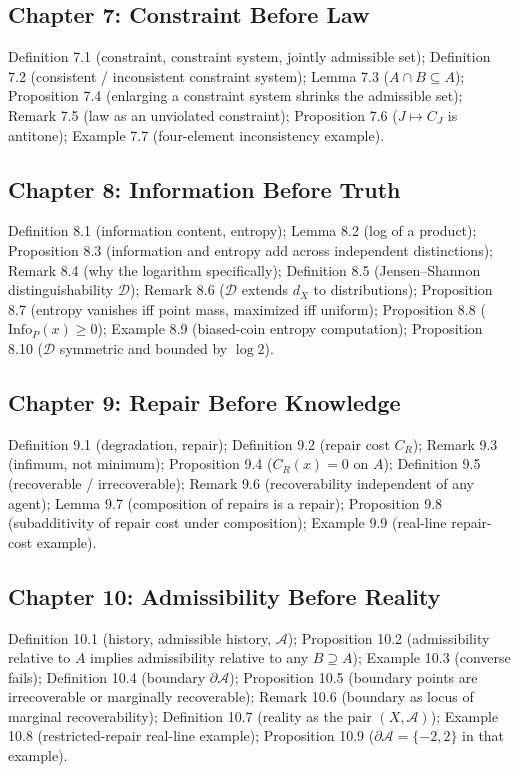 \documentclass[11pt]{book}
\begin{document}
\subsection*{Chapter 7: Constraint Before Law}
Definition 7.1 (constraint, constraint system, jointly admissible set); Definition 7.2 (consistent / inconsistent constraint system); Lemma 7.3 ($A \cap B \subseteq A$); Proposition 7.4 (enlarging a constraint system shrinks the admissible set); Remark 7.5 (law as an unviolated constraint); Proposition 7.6 ($J\mapsto C_J$ is antitone); Example 7.7 (four-element inconsistency example).

\subsection*{Chapter 8: Information Before Truth}
Definition 8.1 (information content, entropy); Lemma 8.2 (log of a product); Proposition 8.3 (information and entropy add across independent distinctions); Remark 8.4 (why the logarithm specifically); Definition 8.5 (Jensen--Shannon distinguishability $\mathcal D$); Remark 8.6 ($\mathcal D$ extends $d_X$ to distributions); Proposition 8.7 (entropy vanishes iff point mass, maximized iff uniform); Proposition 8.8 ($\mathrm{Info}_P(x)\geq0$); Example 8.9 (biased-coin entropy computation); Proposition 8.10 ($\mathcal D$ symmetric and bounded by $\log 2$).

\subsection*{Chapter 9: Repair Before Knowledge}
Definition 9.1 (degradation, repair); Definition 9.2 (repair cost $C_R$); Remark 9.3 (infimum, not minimum); Proposition 9.4 ($C_R(x)=0$ on $A$); Definition 9.5 (recoverable / irrecoverable); Remark 9.6 (recoverability independent of any agent); Lemma 9.7 (composition of repairs is a repair); Proposition 9.8 (subadditivity of repair cost under composition); Example 9.9 (real-line repair-cost example).

\subsection*{Chapter 10: Admissibility Before Reality}
Definition 10.1 (history, admissible history, $\mathcal A$); Proposition 10.2 (admissibility relative to $A$ implies admissibility relative to any $B \supseteq A$); Example 10.3 (converse fails); Definition 10.4 (boundary $\partial\mathcal A$); Proposition 10.5 (boundary points are irrecoverable or marginally recoverable); Remark 10.6 (boundary as locus of marginal recoverability); Definition 10.7 (reality as the pair $(X,\mathcal A)$); Example 10.8 (restricted-repair real-line example); Proposition 10.9 ($\partial\mathcal A=\{-2,2\}$ in that example).
\end{document}
